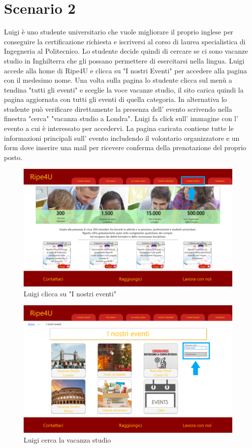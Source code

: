    \section{Scenario 2}
    Luigi è uno studente universitario che vuole migliorare il proprio inglese
    per conseguire la certificazione richiesta e iscriversi al corso di laurea
    specialistica di Ingegneria al Politecnico. Lo studente decide quindi di cercare
    se ci sono vacanze studio in Inghilterra che gli possano permettere di
    esercitarsi nella lingua. Luigi accede alla home di Ripe4U e clicca su "I nostri
    Eventi" per accedere alla pagina con il medesimo nome. Una volta sulla pagina lo
    studente clicca sul menù a tendina "tutti gli eventi" e sceglie la voce
    vacanze studio, il sito carica quindi la pagina aggiornata con tutti gli
    eventi di quella categoria. In alternativa lo studente può
    verificare direttamente la presenza dell' evento scrivendo nella finestra
    "cerca" "vacanza studio a Londra". Luigi fa click sull' immagine con l'
    evento a cui è interessato per accedervi. La pagina caricata contiene tutte le
    informazioni principali sull' evento includendo il volontario organizzatore e un
    form dove inserire una mail per ricevere conferma della prenotazione del proprio
    posto.
    \begin{figure}[H]
        \centering
        \includegraphics[scale=0.25]{resources/images/scenario2-1.png}
        \caption{Luigi clicca su "I nostri eventi"}
    \end{figure}
    \begin{figure}[H]
        \centering
        \includegraphics[scale=0.25]{resources/images/scenario2-2.png}
        \caption{Luigi cerca la vacanza studio}
    \end{figure}
